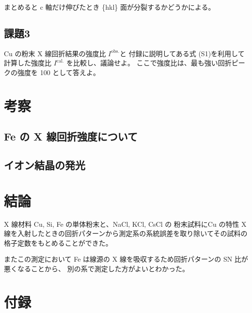 \documentclass[11pt,dvipdfmx,a4paper]{jsarticle}
\begin{document}
まとめると c 軸だけ伸びたとき \{hkl\} 面が分裂するかどうかによる。

\subsection*{課題3}
Cu の粉末 X 線回折結果の強度比 \(I^{\text{obs.}}\)と
付録に説明してある式 (S1)を利用して計算した強度比 \(I^{\text{cal.}}\)
を比較し、議論せよ。
ここで強度比は、最も強い回折ピークの強度を 100 として答えよ。

\section{考察}
\subsection{Fe の X 線回折強度について}


\subsection{イオン結晶の発光}


\section{結論}
X 線材料 Cu, Si, Fe の単体粉末と、NaCl, KCl, CsCl の
粉末試料にCu の特性 X 線を入射したときの回折パターンから測定系の系統誤差を取り除いてその試料の格子定数をもとめることができた。

またこの測定において Fe は線源の X 線を吸収するため回折パターンの SN 比が悪くなることから、
別の系で測定した方がよいとわかった。




\section*{付録}
\end{document}

